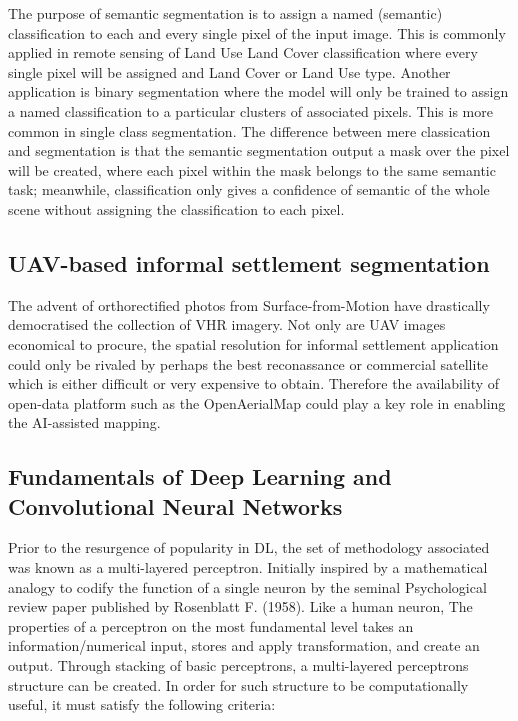 \documentclass[11pt, a4paper, twoside]{report}
\begin{document}
The purpose of semantic segmentation is to assign a named (semantic) classification to each and every single pixel of the input image. This is commonly applied in remote sensing of Land Use Land Cover classification where every single pixel will be assigned and Land Cover or Land Use type. Another application is binary segmentation where the model will only be trained to assign a named classification to a particular clusters of associated pixels. This is more common in single class segmentation. The difference between mere classication and segmentation is that the semantic segmentation output a mask over the pixel will be created, where each pixel within the mask belongs to the same semantic task; meanwhile, classification only gives a confidence of semantic of the whole scene without assigning the classification to each pixel.\\\par


\subsection{UAV-based informal settlement segmentation}\label{CVandCNN}

The advent of orthorectified photos from Surface-from-Motion have drastically democratised the collection of VHR imagery. Not only are UAV images economical to procure, the spatial resolution for informal settlement application could only be rivaled by perhaps the best reconassance or commercial satellite which is either difficult or very expensive to obtain. Therefore the availability of open-data platform such as the OpenAerialMap could play a key role in enabling the AI-assisted mapping.\\\par

\subsection{Fundamentals of Deep Learning and Convolutional Neural Networks}

Prior to the resurgence of popularity in DL, the set of methodology associated was known as a multi-layered perceptron. Initially inspired by a mathematical analogy to codify the function of a single neuron by the seminal Psychological review paper published by Rosenblatt F. (1958). Like a human neuron, The properties of a perceptron on the most fundamental level takes an information/numerical input, stores and apply transformation, and create an output. Through stacking of basic perceptrons, a multi-layered perceptrons structure can be created. In order for such structure to be computationally useful, it must satisfy the following criteria:\\\par
\end{document}
